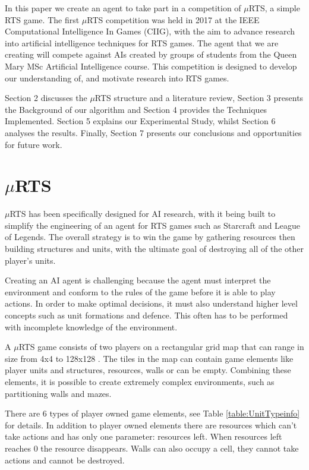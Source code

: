 \documentclass[]{article}
\begin{document}
In this paper we create an agent to take part in a competition of $\mu$RTS, a simple RTS game. The first $\mu$RTS competition was held in 2017 \cite{ontanon2018first} at the IEEE Computational Intelligence In Games (CIIG), with the aim to advance research into artificial intelligence techniques for RTS games. The agent that we are creating will compete against AIs created by groups of students from the Queen Mary MSc Artificial Intelligence course. This competition is designed to develop our understanding of, and motivate research into RTS games. 

Section 2 discusses the $\mu$RTS structure and a literature review, Section 3 presents the Background of our algorithm and Section 4 provides the Techniques Implemented. Section 5 explains our Experimental Study, whilst Section 6 analyses the results. Finally, Section 7 presents our conclusions and opportunities for future work. 

\section{$\mu$RTS}
$\mu$RTS has been specifically designed for AI research, with it being built to simplify the engineering of an agent for RTS games such as Starcraft and League of Legends. The overall strategy is to win the game by gathering resources then building structures and units, with the ultimate goal of destroying all of the other player’s units.

Creating an AI agent is challenging because the agent must interpret the environment and conform to the rules of the game before it is able to play actions. In order to make optimal decisions, it must also understand higher level concepts such as unit formations and defence. This often has to be performed with incomplete knowledge of the environment.  

A   $\mu$RTS game consists of two players on a rectangular grid map that can range in size from 4x4 to 128x128 \cite{GameDefi5:online}.  The tiles in the map can contain game elements like player units and structures, resources, walls or can be empty.  Combining these elements, it is possible to create extremely complex environments, such as partitioning walls and mazes.  

There are 6 types of player owned game elements, see Table \ref{table:UnitTypeinfo} for details. In addition to player owned elements there are resources which can’t take actions and has only one parameter: resources left. When resources left reaches 0 the resource disappears. Walls can also occupy a cell, they cannot take actions and cannot be destroyed. 
\end{document}
